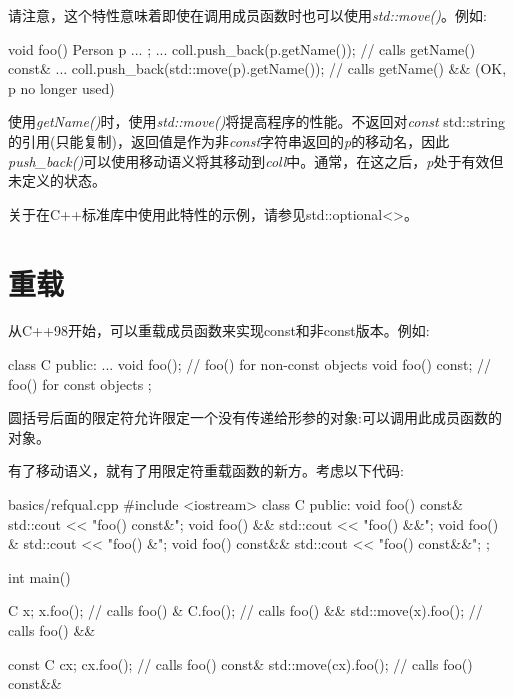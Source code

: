 
请注意，这个特性意味着即使在调用成员函数时也可以使用\textit{std::move()}。例如:\par

\begin{codebox}[cpp]
void foo()
{
  Person p{ ... };
  ...
  coll.push_back(p.getName()); // calls getName() const&
  ...
  coll.push_back(std::move(p).getName()); // calls getName() && (OK, p no longer used)
}
\end{codebox}

使用\textit{getName()}时，使用\textit{std::move()}将提高程序的性能。不返回对\textit{const} std::string的引用(只能复制)，返回值是作为非\textit{const}字符串返回的\textit{p}的移动名，因此\textit{push\_\allowbreak{}back(\allowbreak{})\allowbreak{}}可以使用移动语义将其移动到\textit{coll}中。通常，在这之后，\textit{p}处于有效但未定义的状态。\par

关于在C++标准库中使用此特性的示例，请参见std::optional<>。\par


\section{重载}

从C++98开始，可以重载成员函数来实现const和非const版本。例如:\par

\begin{codebox}[cpp]
class C {
public:
  ...
  void foo(); // foo() for non-const objects
  void foo() const; // foo() for const objects
};
\end{codebox}

圆括号后面的限定符允许限定一个没有传递给形参的对象:可以调用此成员函数的对象。\par

有了移动语义，就有了用限定符重载函数的新方。考虑以下代码:\par

\begin{codeboxt}[cpp]{basics/refqual.cpp}
#include <iostream>
class C {
public:
  void foo() const& {
    std::cout << "foo() const&\n";
  }
  void foo() && {
    std::cout << "foo() &&\n";
  }
  void foo() & {
    std::cout << "foo() &\n";
  }
  void foo() const&& {
    std::cout << "foo() const&&\n";
  }
};

int main()
{
  C x;
  x.foo(); // calls foo() &
  C{}.foo(); // calls foo() &&
  std::move(x).foo(); // calls foo() &&

  const C cx;
  cx.foo(); // calls foo() const&
  std::move(cx).foo(); // calls foo() const&&
}
\end{codeboxt}


